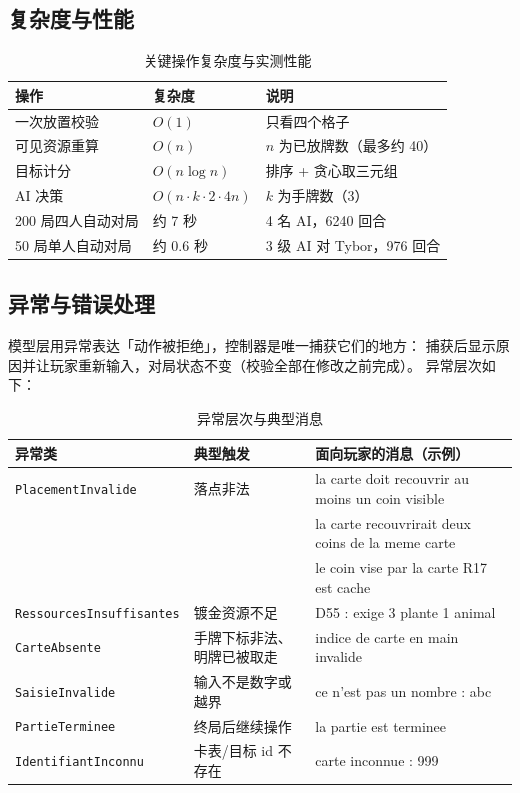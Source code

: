 \documentclass[11pt,a4paper]{ctexart}
\newcommand{\cl}[1]{\texttt{#1}}
\begin{document}
\subsection{复杂度与性能}
\begin{table}[h]
\centering
\small
\begin{tabular}{p{4.6cm}p{4.6cm}p{4.2cm}}
\toprule
操作 & 复杂度 & 说明 \\
\midrule
一次放置校验 & $O(1)$ & 只看四个格子 \\
可见资源重算 & $O(n)$ & $n$ 为已放牌数（最多约 40） \\
目标计分 & $O(n \log n)$ & 排序 + 贪心取三元组 \\
AI 决策 & $O(n \cdot k \cdot 2 \cdot 4n)$ & $k$ 为手牌数（3） \\
200 局四人自动对局 & 约 7 秒 & 4 名 AI，6240 回合 \\
50 局单人自动对局 & 约 0.6 秒 & 3 级 AI 对 Tybor，976 回合 \\
\bottomrule
\end{tabular}
\caption{关键操作复杂度与实测性能}
\label{tab:perf}
\end{table}

\subsection{异常与错误处理}
模型层用异常表达「动作被拒绝」，控制器是唯一捕获它们的地方：
捕获后显示原因并让玩家重新输入，对局状态不变（校验全部在修改之前完成）。
异常层次如下：

\begin{table}[h]
\centering
\small
\begin{tabular}{p{4.5cm}p{2.9cm}p{7.2cm}}
\toprule
异常类 & 典型触发 & 面向玩家的消息（示例） \\
\midrule
\cl{PlacementInvalide} & 落点非法 & la carte doit recouvrir au moins un coin visible \\
 &  & la carte recouvrirait deux coins de la meme carte \\
 &  & le coin vise par la carte R17 est cache \\
\cl{RessourcesInsuffisantes} & 镀金资源不足 & D55 : exige 3 plante 1 animal \\
\cl{CarteAbsente} & 手牌下标非法、明牌已被取走 & indice de carte en main invalide \\
\cl{SaisieInvalide} & 输入不是数字或越界 & ce n'est pas un nombre : abc \\
\cl{PartieTerminee} & 终局后继续操作 & la partie est terminee \\
\cl{IdentifiantInconnu} & 卡表/目标 id 不存在 & carte inconnue : 999 \\
\bottomrule
\end{tabular}
\caption{异常层次与典型消息}
\label{tab:exceptions}
\end{table}
\end{document}
